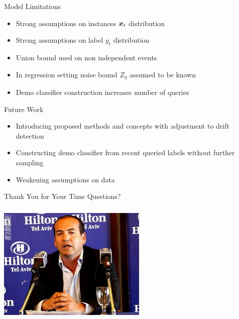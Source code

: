 \documentclass{beamer}
\begin{document}
\begin{frame}{Model Limitations}
\begin{itemize}
\item Strong assumptions on instances ${\boldsymbol{x}}_{t}$ distribution \newline
\item Strong assumptions on label $y_t$ distribution\newline
\item Union bound used on non independent events\newline
\item In regression setting noise bound $Z_{\eta}$ assumed to be known\newline
\item  Demo classifier construction increases number of queries \newline
\end{itemize}
\end{frame}



\begin{frame}{Future Work}
\begin{itemize}
\item Introducing proposed methods and concepts with adjustment to drift detection
\item Constructing demo classifier from recent queried labels without further sampling 
\item Weakening assumptions on data
\end{itemize}
\end{frame}

\begin{frame}{Thank You for Your Time}
Questions?
\begin{center}
\includegraphics[height=2.3in,width=2.8in]{berko.jpg}
\end{center}

\end{frame}
\end{document}
